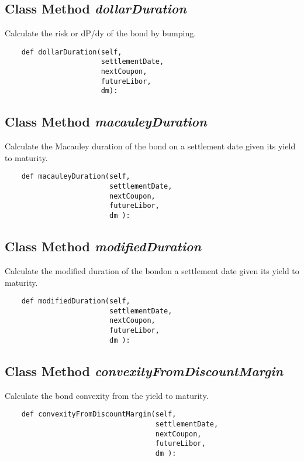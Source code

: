 \documentclass[twoside,11pt]{book}
\begin{document}
\subsection{Class Method {\it dollarDuration}}
Calculate the risk or dP/dy of the bond by bumping. 

\begin{lstlisting}
    def dollarDuration(self, 
                       settlementDate, 
                       nextCoupon,
                       futureLibor,
                       dm):
\end{lstlisting}

\subsection{Class Method {\it macauleyDuration}}
Calculate the Macauley duration of the bond on a settlement date given its yield to maturity. 

\begin{lstlisting}
    def macauleyDuration(self,
                         settlementDate,
                         nextCoupon,
                         futureLibor,
                         dm ):
\end{lstlisting}

\subsection{Class Method {\it modifiedDuration}}
Calculate the modified duration of the bondon a settlement date given its yield to maturity. 

\begin{lstlisting}
    def modifiedDuration(self,
                         settlementDate,
                         nextCoupon,
                         futureLibor,
                         dm ):
\end{lstlisting}

\subsection{Class Method {\it convexityFromDiscountMargin}}
Calculate the bond convexity from the yield to maturity. 

\begin{lstlisting}
    def convexityFromDiscountMargin(self, 
                                    settlementDate,
                                    nextCoupon,
                                    futureLibor,
                                    dm ):
\end{lstlisting}
\end{document}
